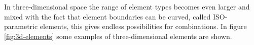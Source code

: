 
In three-dimensional space the range of element types
becomes even larger and mixed with the fact that element boundaries
can be curved, called ISO-parametric elements, this gives endless
possibilities for combinations. In figure \vref{fig:3d-elements} some
examples of three-dimensional elements are shown.

